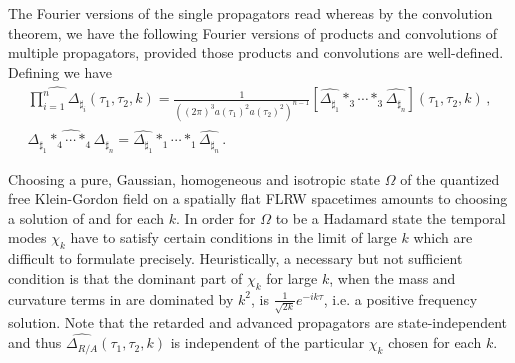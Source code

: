 \documentclass[10pt]{book}
\newcommand{\Mcal}{\mathcal{M}}
\theoremstyle{break}
\begin{document}
The Fourier versions of the single propagators read
whereas by the convolution theorem, we have the following Fourier versions of products and convolutions of multiple propagators, provided those products and convolutions are well-defined. 
Defining
we have
\begin{gather}%
\widehat{\prod^n_{i=1}\Delta_{\sharp_i}}(\tau_1,\tau_2,k)=\frac{1}{\left((2\pi)^3 a(\tau_1)^{2}a(\tau_2)^{2}\right)^{n-1}}\left[\widehat{\Delta_{\sharp_1}}\ast_3\cdots\ast_3\widehat{\Delta_{\sharp_n}}\right](\tau_1,\tau_2,k)\,,\\
\widehat{\Delta_{\sharp_1}\ast_4\cdots\ast_4\Delta_{\sharp_n}}=\widehat{\Delta_{\sharp_1}}\ast_1\cdots\ast_1
\widehat{\Delta_{\sharp_n}}\,.
\end{gather}

Choosing a pure, Gaussian, homogeneous and isotropic state $\Omega$ of the quantized free Klein-Gordon field on a spatially flat FLRW spacetimes amounts to choosing a solution of %
and %
for each $k$. In order for $\Omega$ to be a Hadamard state the temporal modes $\chi_k$ have to satisfy certain conditions in the limit of large $k$ which are difficult to formulate precisely. Heuristically, a necessary but not sufficient condition is that the dominant part of $\chi_k$ for large $k$, when the mass and curvature terms in %
are dominated by $k^2$, is $\frac{1}{\sqrt{2k}}e^{-ik\tau}$, i.e. a positive frequency solution. Note that the retarded and advanced propagators are state-independent and thus $\widehat{\Delta_{R/A}}(\tau_1,\tau_2,k)$ is independent of the particular $\chi_k$ chosen for each $k$.
\end{document}
